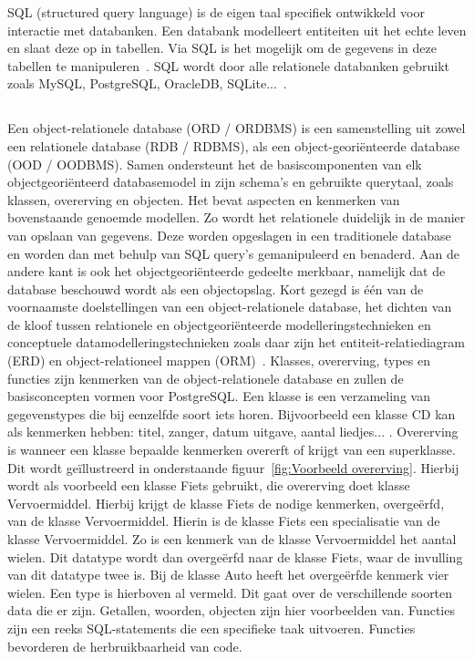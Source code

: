 SQL (structured query language) is de eigen taal specifiek ontwikkeld voor interactie met databanken. Een databank modelleert entiteiten uit het echte leven en slaat deze op in tabellen. Via SQL is het mogelijk om de gegevens in deze tabellen te manipuleren~\autocite{Carchedi2020}. SQL wordt door alle relationele databanken gebruikt zoals MySQL, PostgreSQL, OracleDB, SQLite...~\autocite{Codecademy}. 

\subsection{}
\label{subsec:Object-relationele databank}

Een object-relationele database (ORD / ORDBMS) is een samenstelling uit zowel een relationele database (RDB / RDBMS), als een object-georiënteerde database (OOD / OODBMS). Samen ondersteunt het de basiscomponenten van elk objectgeoriënteerd databasemodel in zijn schema's en gebruikte querytaal, zoals klassen, overerving en objecten. Het bevat aspecten en kenmerken van bovenstaande genoemde modellen. Zo wordt het relationele duidelijk in de manier van opslaan van gegevens. Deze worden opgeslagen in een traditionele database en worden dan met behulp van SQL query's gemanipuleerd en benaderd. Aan de andere kant is ook het objectgeoriënteerde gedeelte merkbaar, namelijk dat de database beschouwd wordt als een objectopslag. Kort gezegd is één van de voornaamste doelstellingen van een object-relationele database, het dichten van de kloof tussen relationele en objectgeoriënteerde modelleringstechnieken en conceptuele datamodelleringstechnieken zoals daar zijn het entiteit-relatiediagram (ERD) en object-relationeel mappen (ORM)~\autocite{Technopedia2021}. %
Klasses, overerving, types en functies zijn kenmerken van de object-relationele database en zullen de basisconcepten vormen voor PostgreSQL. Een klasse is een verzameling van gegevenstypes die bij eenzelfde soort iets horen. Bijvoorbeeld een klasse CD kan als kenmerken hebben: titel, zanger, datum uitgave, aantal liedjes... . 
Overerving is wanneer een klasse bepaalde kenmerken overerft of krijgt van een superklasse. Dit wordt geïllustreerd in onderstaande figuur~\ref{fig:Voorbeeld overerving}. Hierbij wordt als voorbeeld een klasse Fiets gebruikt, die overerving doet klasse Vervoermiddel. Hierbij krijgt de klasse Fiets de nodige kenmerken, overgeërfd, van de klasse Vervoermiddel. Hierin is de klasse Fiets een specialisatie van de klasse Vervoermiddel. Zo is een kenmerk van de klasse Vervoermiddel het aantal wielen. Dit datatype wordt dan overgeërfd naar de klasse Fiets, waar de invulling van dit datatype twee is. Bij de klasse Auto heeft het overgeërfde kenmerk vier wielen. Een type is hierboven al vermeld. Dit gaat over de verschillende soorten data die er zijn. Getallen, woorden, objecten zijn hier voorbeelden van. Functies zijn een reeks SQL-statements die een specifieke taak uitvoeren. Functies bevorderen de herbruikbaarheid van code.


